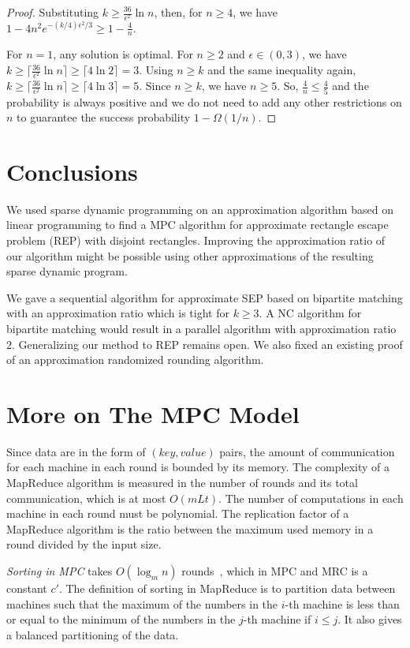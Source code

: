\documentclass[preprint,12pt]{elsarticle}
\begin{document}
\begin{proof}
Substituting $k\geq \frac{36}{\epsilon^2} \ln n$, then, for $n\geq 4$, we have
$
1- 4n^2 e^{-(k/4)\epsilon^2/3}\geq 1-\frac{4}{n}.
$

For $n=1$, any solution is optimal. For $n\geq 2$ and $\epsilon\in (0,3)$, we have
$k\geq \lceil \frac{36}{\epsilon^2} \ln n\rceil \geq \lceil4\ln 2\rceil = 3$. Using $n\geq k$ and the same inequality again, $k\geq \lceil \frac{36}{\epsilon^2} \ln n\rceil \geq \lceil4\ln 3\rceil = 5$.
Since $n\geq k$, we have $n\geq 5$. So, $\frac{4}{n}\leq \frac{4}{5}$ and the probability is always positive and we do not need to add any other restrictions on $n$ to guarantee the success probability $1-\Omega(1/n)$.
\end{proof}

\section{Conclusions}
We used sparse dynamic programming on an approximation algorithm based on linear programming to find a MPC algorithm for approximate rectangle escape problem (REP) with disjoint rectangles.
Improving the approximation ratio of our algorithm might be possible using other approximations of the resulting sparse dynamic program.

We gave a sequential algorithm for approximate SEP based on bipartite matching with an approximation ratio which is tight for $k\geq 3$. A $\mathrm{NC}$ algorithm for bipartite matching would result in a parallel algorithm with approximation ratio $2$.
Generalizing our method to REP remains open. We also fixed an existing proof of an approximation randomized rounding algorithm.


 

\appendix


\section{More on The MPC Model}
Since data are in the form of $(key,value)$ pairs, the amount of communication for each machine in each round is bounded by its memory. The complexity of a MapReduce algorithm is measured in the number of rounds and its total communication, which is at most $O(mLt)$. The number of computations in each machine in each round must be polynomial.
The replication factor of a MapReduce algorithm is the ratio between the maximum used memory in a round divided by the input size.

{\em Sorting in MPC} takes $O(\log_m n)$ rounds~\cite{goodrich2011sorting}, which in MPC and MRC is a constant $c'$. The definition of sorting in MapReduce is to partition data between machines such that the maximum of the numbers in the $i$-th machine is less than or equal to the minimum of the numbers in the $j$-th machine if $i\leq j$. It also gives a balanced partitioning of the data.
\end{document}
